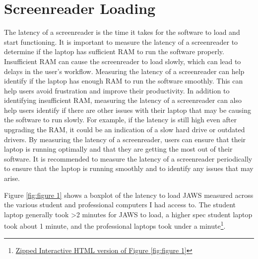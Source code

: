 \documentclass[14pt,letterpaper,twoside]{extreport}
\begin{document}
\pagebreak \hypertarget{screenreader-loading}{}\section{Screenreader Loading}\label{screenreader-loading}
The latency of a screenreader is the time it takes for the software to load and start functioning. It is important to measure the latency of a screenreader to determine if the laptop has sufficient RAM to run the software properly. Insufficient RAM can cause the screenreader to load slowly, which can lead to delays in the user’s workflow. Measuring the latency of a screenreader can help identify if the laptop has enough RAM to run the software smoothly. This can help users avoid frustration and improve their productivity. In addition to identifying insufficient RAM, measuring the latency of a screenreader can also help users identify if there are other issues with their laptop that may be causing the software to run slowly. For example, if the latency is still high even after upgrading the RAM, it could be an indication of a slow hard drive or outdated drivers. By measuring the latency of a screenreader, users can ensure that their laptop is running optimally and that they are getting the most out of their software. It is recommended to measure the latency of a screenreader periodically to ensure that the laptop is running smoothly and to identify any issues that may arise.

Figure \ref{fig:figure 1} shows a boxplot of the latency to load JAWS measured across the various student and professional computers I had access to. The student laptop generally took \textgreater2 minutes for JAWS to load, a higher spec student laptop took about 1 minute, and the professional laptops took under a minute\footnote{\href{https://github.com/mrhunsaker/MiscResources/raw/main/ComputerRBDisplaySpecsTVIFig1.zip}{Zipped Interactive HTML version of Figure \ref{fig:figure 1}}}.
\end{document}
